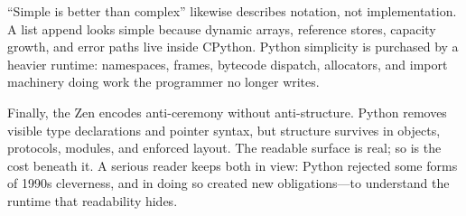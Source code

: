 ``Simple is better than complex'' likewise describes notation, not implementation. A list append looks simple because dynamic arrays, reference stores, capacity growth, and error paths live inside CPython. Python simplicity is purchased by a heavier runtime: namespaces, frames, bytecode dispatch, allocators, and import machinery doing work the programmer no longer writes.

Finally, the Zen encodes anti-ceremony without anti-structure. Python removes visible type declarations and pointer syntax, but structure survives in objects, protocols, modules, and enforced layout. The readable surface is real; so is the cost beneath it. A serious reader keeps both in view: Python rejected some forms of 1990s cleverness, and in doing so created new obligations---to understand the runtime that readability hides.
